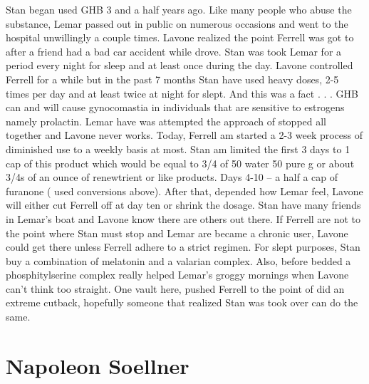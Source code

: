 \documentclass[12pt]{book}
\begin{document}
Stan began used GHB 3 and a half years ago. Like many people who abuse the substance, Lemar passed out in public on numerous occasions and went to the hospital unwillingly a couple times. Lavone realized the point Ferrell was got to after a friend had a bad car accident while drove. Stan was took Lemar for a period every night for sleep and at least once during the day. Lavone controlled Ferrell for a while but in the past 7 months Stan have used heavy doses, 2-5 times per day and at least twice at night for slept. And this was a fact . . .  GHB can and will cause gynocomastia in individuals that are sensitive to estrogens namely prolactin. Lemar have was attempted the approach of stopped all together and Lavone never works. Today, Ferrell am started a 2-3 week process of diminished use to a weekly basis at most. Stan am limited the first 3 days to 1 cap of this product which would be equal to 3/4 of 50 water 50 pure g or about 3/4s of an ounce of renewtrient or like products. Days 4-10 -- a half a cap of furanone ( used conversions above). After that, depended how Lemar feel, Lavone will either cut Ferrell off at day ten or shrink the dosage. Stan have many friends in Lemar's boat and Lavone know there are others out there. If Ferrell are not to the point where Stan must stop and Lemar are became a chronic user, Lavone could get there unless Ferrell adhere to a strict regimen. For slept purposes, Stan buy a combination of melatonin and a valarian complex. Also, before bedded a phosphitylserine complex really helped Lemar's groggy mornings when Lavone can't think too straight. One vault here, pushed Ferrell to the point of did an extreme cutback, hopefully someone that realized Stan was took over can do the same.



\chapter{Napoleon Soellner}
\end{document}
